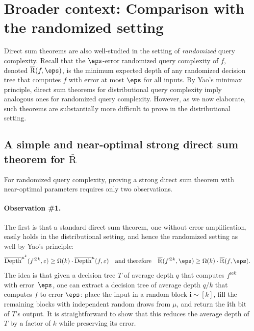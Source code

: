 \section{Broader context: Comparison with the randomized setting}
\label{sec:challenges}

Direct sum theorems are also well-studied in the setting of {\sl randomized} query complexity. Recall that the $\eps$-error randomized query complexity of $f$, denoted $\overline{\mathrm{R}}(f,\eps)$, is the minimum expected depth of any randomized  decision tree that computes $f$ with error at most $\eps$ for all inputs.  By Yao's minimax principle, direct sum theorems for distributional query complexity imply analogous ones for randomized query complexity. However, as we now elaborate, such theorems are substantially more difficult to prove in the distributional setting. 


\subsection{A simple and near-optimal strong direct sum theorem for $\overline{\mathrm{R}}$} 
\label{sec:simple}
For randomized query complexity, proving a strong direct sum theorem with near-optimal parameters requires only two observations. 

\paragraph{Observation \#1.} The first is that a standard direct sum theorem, one without error amplification, easily holds in the distributional setting, and hence the randomized setting as well by Yao's principle:
\begin{equation}
\overline{\mathrm{Depth}}^{\mu^k}(f^{\otimes k},\varepsilon) \ge \Omega(k) \cdot \overline{\mathrm{Depth}}^{\mu}(f,\varepsilon) \quad \text{and therefore} \quad \overline{\mathrm{R}}(f^{\otimes k},\eps) \ge \Omega(k)\cdot \overline{\mathrm{R}}(f,\eps). \label{eq:BDK1} \end{equation} 
The idea is that given a decision tree $T$ of average depth $q$ that computes $f^{\otimes k}$ with error~$\eps$, one can extract a decision tree of average depth $q/k$ that computes $f$ to error $\eps$:  place the input in a random block $\boldsymbol{i}\sim [k]$, fill the remaining blocks with independent random draws from $\mu$, and return the $\boldsymbol{i}$th bit of $T$'s output. It is straightforward to show that this reduces the average depth of $T$ by a factor of $k$ while preserving its error. 

